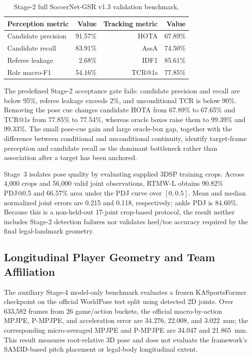 \documentclass[runningheads]{llncs}
\begin{document}
\begin{table}[H]
\centering
\caption{Stage-2 full SoccerNet-GSR v1.3 validation benchmark.}
\label{tab:stage2_results}
\small
\begin{tabular}{lrrr}
\toprule
Perception metric & Value & Tracking metric & Value \\
\midrule
Candidate precision & 91.57\% & HOTA & 67.89\% \\
Candidate recall & 83.91\% & AssA & 74.50\% \\
Referee leakage & 2.68\% & IDF1 & 85.61\% \\
Role macro-F1 & 54.16\% & TCR@1s & 77.85\% \\
\bottomrule
\end{tabular}
\end{table}

The predefined Stage-2 acceptance gate fails: candidate precision and recall are below 95\%, referee leakage exceeds 2\%, and unconditional TCR is below 90\%. Removing the pose cue changes candidate HOTA from 67.89\% to 67.65\% and TCR@1s from 77.85\% to 77.54\%, whereas oracle boxes raise them to 99.39\% and 99.33\%. The small pose-cue gain and large oracle-box gap, together with the difference between conditional and unconditional continuity, identify target-frame perception and candidate recall as the dominant bottleneck rather than association after a target has been anchored.

Stage~3 isolates pose quality by evaluating supplied 3DSP training crops. Across 4,000 crops and 56,000 valid joint observations, RTMW-L obtains 90.82\% PDJ@0.5 and 66.57\% area under the PDJ curve over $[0,0.5]$. Mean and median normalized joint errors are 0.215 and 0.118, respectively; ankle PDJ is 84.60\%. Because this is a non-held-out 17-joint crop-based protocol, the result neither includes Stage-2 detection failures nor validates heel/toe accuracy required by the final legal-landmark geometry.

\subsection{Longitudinal Player Geometry and Team Affiliation}
\label{subsec:results_player_team}
The auxiliary Stage-4 model-only benchmark evaluates a frozen KASportsFormer checkpoint on the official WorldPose test split using detected 2D joints. Over 633,582 frames from 26 game/action buckets, the official macro-by-action MPJPE, P-MPJPE, and acceleration error are 34.276, 22.008, and 3.022~mm; the corresponding micro-averaged MPJPE and P-MPJPE are 34.047 and 21.865~mm. This result measures root-relative 3D pose and does not evaluate the framework's SAM3D-based pitch placement or legal-body longitudinal extent.
\end{document}
